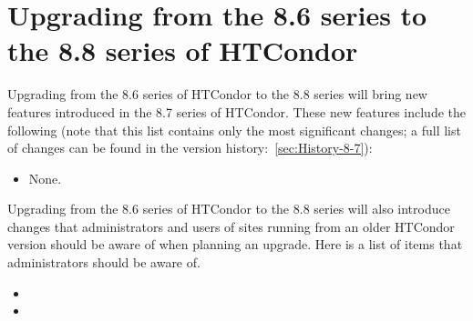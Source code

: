 \section{Upgrading from the 8.6 series to the 8.8 series of HTCondor}\label{sec:to-8.8}

Upgrading from the 8.6 series of HTCondor to the 8.8 series
will bring new features introduced in the 8.7 series of HTCondor.
These new features include the following (note that this list contains
only the most significant changes; a full list of changes can be
found in the version history:~\ref{sec:History-8-7}):

\begin{itemize}

\item None.

\end{itemize}

Upgrading from the 8.6 series of HTCondor to the 8.8 series will
also introduce changes that administrators and users of sites running
from an older HTCondor version should be aware of when planning an upgrade.
Here is a list of items that administrators should be aware of.

\begin{itemize}

\item

\item

\end{itemize}




